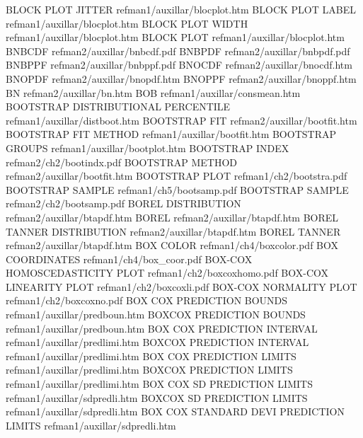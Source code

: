 BLOCK PLOT JITTER                       refman1/auxillar/blocplot.htm
BLOCK PLOT LABEL                        refman1/auxillar/blocplot.htm
BLOCK PLOT WIDTH                        refman1/auxillar/blocplot.htm
BLOCK PLOT                              refman1/auxillar/blocplot.htm
BNBCDF                                  refman2/auxillar/bnbcdf.pdf
BNBPDF                                  refman2/auxillar/bnbpdf.pdf
BNBPPF                                  refman2/auxillar/bnbppf.pdf
BNOCDF                                  refman2/auxillar/bnocdf.htm
BNOPDF                                  refman2/auxillar/bnopdf.htm
BNOPPF                                  refman2/auxillar/bnoppf.htm
BN                                      refman2/auxillar/bn.htm
BOB                                     refman1/auxillar/consmean.htm
BOOTSTRAP DISTRIBUTIONAL PERCENTILE     refman1/auxillar/distboot.htm
BOOTSTRAP FIT                           refman2/auxillar/bootfit.htm
BOOTSTRAP FIT METHOD                    refman1/auxillar/bootfit.htm
BOOTSTRAP GROUPS                        refman1/auxillar/bootplot.htm
BOOTSTRAP INDEX                         refman2/ch2/bootindx.pdf
BOOTSTRAP METHOD                        refman2/auxillar/bootfit.htm
BOOTSTRAP PLOT                          refman1/ch2/bootstra.pdf
BOOTSTRAP SAMPLE                        refman1/ch5/bootsamp.pdf
BOOTSTRAP SAMPLE                        refman2/ch2/bootsamp.pdf
BOREL DISTRIBUTION                      refman2/auxillar/btapdf.htm
BOREL                                   refman2/auxillar/btapdf.htm
BOREL TANNER DISTRIBUTION               refman2/auxillar/btapdf.htm
BOREL TANNER                            refman2/auxillar/btapdf.htm
BOX COLOR                               refman1/ch4/boxcolor.pdf
BOX COORDINATES                         refman1/ch4/box_coor.pdf
BOX-COX HOMOSCEDASTICITY PLOT           refman1/ch2/boxcoxhomo.pdf
BOX-COX LINEARITY PLOT                  refman1/ch2/boxcoxli.pdf
BOX-COX NORMALITY PLOT                  refman1/ch2/boxcoxno.pdf
BOX COX PREDICTION BOUNDS               refman1/auxillar/predboun.htm
BOXCOX PREDICTION BOUNDS                refman1/auxillar/predboun.htm
BOX COX PREDICTION INTERVAL             refman1/auxillar/predlimi.htm
BOXCOX PREDICTION INTERVAL              refman1/auxillar/predlimi.htm
BOX COX PREDICTION LIMITS               refman1/auxillar/predlimi.htm
BOXCOX PREDICTION LIMITS                refman1/auxillar/predlimi.htm
BOX COX SD PREDICTION LIMITS            refman1/auxillar/sdpredli.htm
BOXCOX SD PREDICTION LIMITS             refman1/auxillar/sdpredli.htm
BOX COX STANDARD DEVI PREDICTION LIMITS refman1/auxillar/sdpredli.htm
